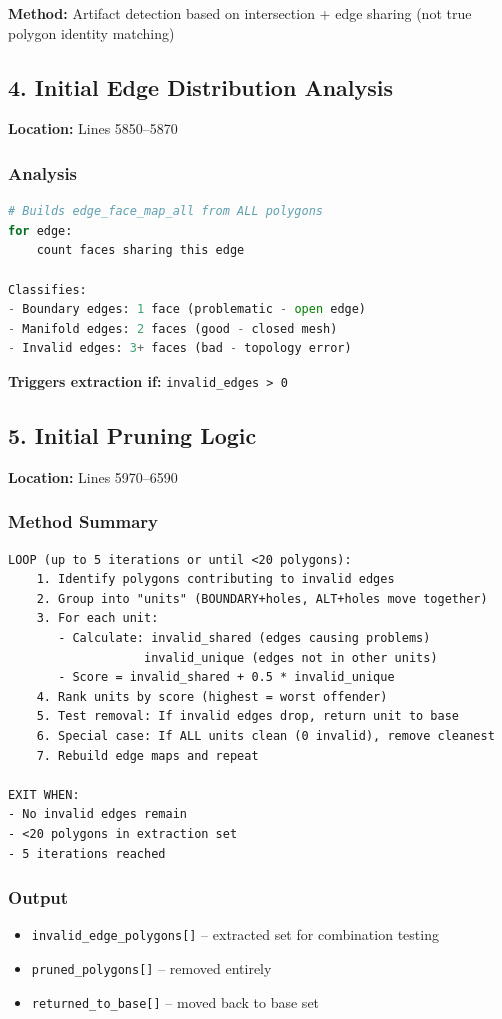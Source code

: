 \documentclass[11pt]{article}
\begin{document}
\textbf{Method:} Artifact detection based on intersection + edge sharing (not true polygon identity matching)

\subsection{4. Initial Edge Distribution Analysis}
\textbf{Location:} Lines 5850--5870

\subsubsection{Analysis}
\begin{lstlisting}[language=Python]
# Builds edge_face_map_all from ALL polygons
for edge:
    count faces sharing this edge
    
Classifies:
- Boundary edges: 1 face (problematic - open edge)
- Manifold edges: 2 faces (good - closed mesh)
- Invalid edges: 3+ faces (bad - topology error)
\end{lstlisting}

\textbf{Triggers extraction if:} \texttt{invalid\_edges > 0}

\subsection{5. Initial Pruning Logic}
\textbf{Location:} Lines 5970--6590

\subsubsection{Method Summary}
\begin{lstlisting}
LOOP (up to 5 iterations or until <20 polygons):
    1. Identify polygons contributing to invalid edges
    2. Group into "units" (BOUNDARY+holes, ALT+holes move together)
    3. For each unit:
       - Calculate: invalid_shared (edges causing problems)
                   invalid_unique (edges not in other units)
       - Score = invalid_shared + 0.5 * invalid_unique
    4. Rank units by score (highest = worst offender)
    5. Test removal: If invalid edges drop, return unit to base
    6. Special case: If ALL units clean (0 invalid), remove cleanest
    7. Rebuild edge maps and repeat
    
EXIT WHEN:
- No invalid edges remain
- <20 polygons in extraction set
- 5 iterations reached
\end{lstlisting}

\subsubsection{Output}
\begin{itemize}
    \item \texttt{invalid\_edge\_polygons[]} -- extracted set for combination testing
    \item \texttt{pruned\_polygons[]} -- removed entirely
    \item \texttt{returned\_to\_base[]} -- moved back to base set
\end{itemize}
\end{document}
